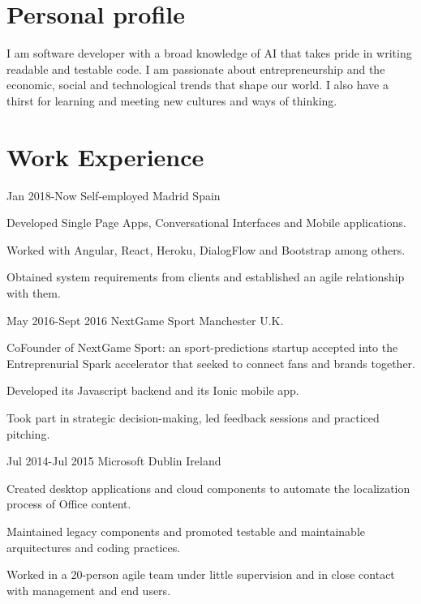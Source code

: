 \documentclass[10pt]{CurriculumVitae}
\begin{document}
  \makeheading


  \section{Personal profile}
    {
      I am software developer with a broad knowledge of AI that takes pride in writing readable and testable code.
      I am passionate about entrepreneurship and the economic, social and technological trends that shape our world.
      I also have a thirst for learning and meeting new cultures and ways of thinking. 
    }


  \section{Work Experience}
      {Jan 2018-Now}
      {Self-employed}
      {Madrid}
      {Spain}
      {
        \item Developed Single Page Apps, Conversational Interfaces and Mobile applications.
        \item Worked with Angular, React, Heroku, DialogFlow and Bootstrap among others.
        \item Obtained system requirements from clients and established an agile relationship with them.
      }
   
      {May 2016-Sept 2016}
      {NextGame Sport} 
      {Manchester}
      {U.K.}
      {
        \item CoFounder of NextGame Sport: an sport-predictions startup accepted into the
          Entreprenurial Spark accelerator that seeked to connect fans and brands together.
        \item Developed its Javascript backend and its Ionic mobile app.
        \item Took part in strategic decision-making, led feedback sessions and practiced pitching.
      }
  
      {Jul 2014-Jul 2015}
      {Microsoft} 
      {Dublin}
      {Ireland}
      {
         \item Created  desktop applications and cloud components to automate the localization
          process of Office content.
         \item Maintained legacy components and promoted testable and maintainable 
         arquitectures and coding practices.
         \item Worked in a 20-person agile team under little supervision and 
         in close contact with management and end users.
      }
    
\end{document}
